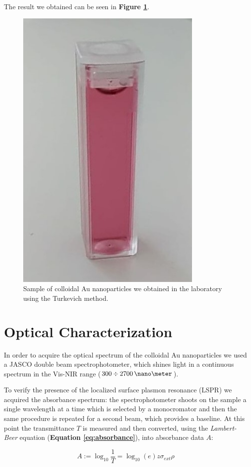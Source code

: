 \documentclass[twocolumn]{article}
\begin{document}
\begin{multicols}{2}
\noindent
The result we obtained can be seen in \textbf{Figure \ref{fig:sample}}.

\begin{figure}[H]
    \centering
    \includegraphics[width=0.5\linewidth]{image/data/turkevich.pdf}
    \caption{Sample of colloidal Au nanoparticles we obtained in the laboratory using the Turkevich method.}
    \label{fig:sample}
\end{figure}

\section{Optical Characterization}
\label{sec:optic_char}
\noindent
In order to acquire the optical spectrum of the colloidal Au nanoparticles we used a JASCO double beam spectrophotometer, which shines light in a continuous spectrum in the Vis-NIR range ($300\div 2700\, \nano\meter $).

To verify the presence of the localized surface plasmon resonance (LSPR) we acquired the absorbance spectrum: the spectrophotometer shoots on the sample a single wavelength at a time which is selected by a monocromator and then the same procedure is repeated for a second beam, which provides a baseline. At this point the transmittance $T$ is measured and then converted, using the \textit{Lambert-Beer} equation (\textbf{Equation \ref{eq:absorbance}}), into absorbance data $A$: 

\begin{equation}
    A:=\log_{10}\frac{1}{T}=\log_{10}(e)z \sigma_{ext} \rho
    \label{eq:absorbance}
\end{equation}


\end{multicols}
\end{document}
